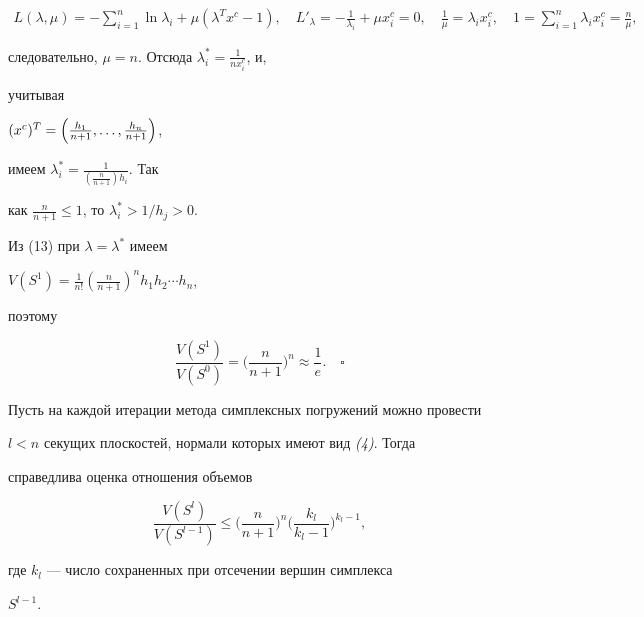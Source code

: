 \begin{gather*}




L(\lambda,\mu)=-\sum^n_{i=1}\ln\lambda_i+


\mu(\lambda^Tx^c-1),\quad


L'_\lambda=-\frac{1}{\lambda_i}+\mu x^c_i=0,\quad


\frac{1}{\mu}=\lambda_i x^c_i,\quad


1=\sum^n_{i=1}\lambda_ix^c_i=\frac{n}{\mu},


\end{gather*}


следовательно, $\mu=n$. Отсюда $\lambda^*_i=\frac{1}{nx^c_i}$, и,


учитывая


$(x^c)^T=\Bigl(\frac{h_1}{n+1},\dotsc,\frac{h_n}{n+1}\Bigr)$,


имеем $\lambda^*_i=\frac{1}{\left(\frac{n}{n+1}\right)h_i}$. Так


как $\frac{n}{n+1}\le 1$, то $\lambda^*_i>1/h_j>0$.





Из (13) при $\lambda=\lambda^*$ имеем


$V(S^1)=\frac{1}{n!}\left(\frac{n}{n+1}\right)^n


h_1h_2\dotsb h_n$,


поэтому


$$


\frac{V(S^1)}{V(S^0)}=\biggl(\frac{n}{n+1}\biggr)^n\approx


\frac{1}{e}.\quad\square


$$





\begin{thm}


Пусть на каждой итерации метода симплексных погружений можно провести


$l<n$ секущих плоскостей, нормали которых имеют вид {\em (4)}. Тогда


справедлива оценка отношения объемов


\begin{equation}


\frac{V(S^l)}{V(S^{l-1})}\le\biggl(\frac{n}{n+1}\biggr)^n


\biggl(\frac{k_l}{k_l-1}\biggr)^{k_l-1},


\end{equation}


где $k_l$ --- число сохраненных при отсечении вершин симплекса


$S^{l-1}$.


\end{thm}





